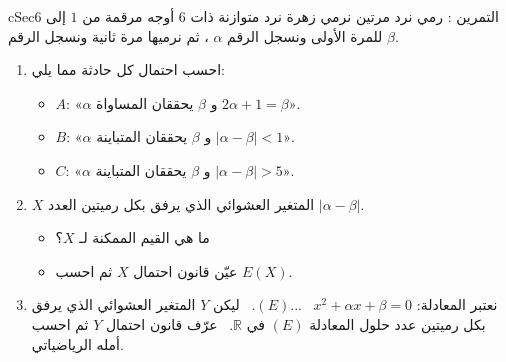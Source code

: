 \documentclass[12pt,a4paper]{article}
\newenvironment{BOX}[2]{\begin{otherlanguage}{english}\begin{arbox}{#1}{#2}}{\end{arbox}\end{otherlanguage}}
\newcounter{exo}
\newenvironment{tamrin}[1]{\stepcounter{exo}\begin{BOX}{cSec}{التمرين \theexo: #1}}{\end{BOX}}
\newcommand{\R}{\mathbb{R}}
\newenvironment{sq}{\begin{itemize}[leftmargin=2.4em,itemsep=3pt]}{\end{itemize}}
\newcommand{\qa}{\item[(أ)]}\newcommand{\qb}{\item[(ب)]}\newcommand{\qc}{\item[(جـ)]}\newcommand{\qd}{\item[(د)]}\newcommand{\qe}{\item[(هـ)]}
\begin{document}
\begin{tamrin}{رمي نرد مرتين}
نرمي زهرة نرد متوازنة ذات $6$ أوجه مرقمة من $1$ إلى $6$ للمرة الأولى ونسجل الرقم $\alpha$ ، ثم نرميها مرة ثانية ونسجل الرقم $\beta$.
\begin{enumerate}
\item احسب احتمال كل حادثة مما يلي:
\begin{sq}
\qa $A$: «$\alpha$ و $\beta$ يحققان المساواة $2\alpha+1=\beta$».
\qb $B$: «$\alpha$ و $\beta$ يحققان المتباينة $|\alpha-\beta|<1$».
\qc $C$: «$\alpha$ و $\beta$ يحققان المتباينة $|\alpha-\beta|>5$».
\end{sq}
\item $X$ المتغير العشوائي الذي يرفق بكل رميتين العدد $|\alpha-\beta|$.
\begin{sq}
\qa ما هي القيم الممكنة لـ $X$؟
\qb عيّن قانون احتمال $X$ ثم احسب $E(X)$.
\end{sq}
\item نعتبر المعادلة: $x^2+\alpha x+\beta=0$ \ ...$(E)$. \ ليكن $Y$ المتغير العشوائي الذي يرفق بكل رميتين عدد حلول المعادلة $(E)$ في $\R$. \ عرّف قانون احتمال $Y$ ثم احسب أمله الرياضياتي.
\end{enumerate}
\end{tamrin}
\end{document}
